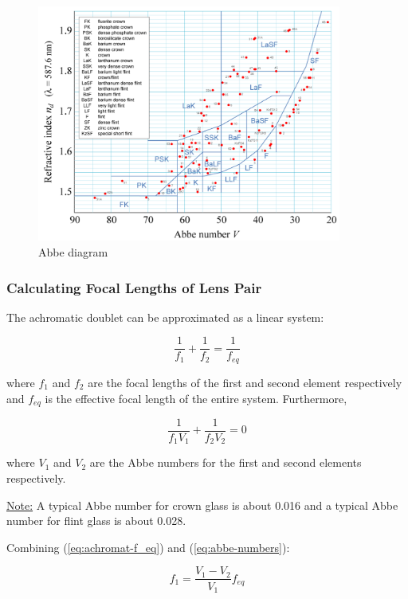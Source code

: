 \begin{figure}[H]
\centering
\includegraphics[width=10cm]{figures/abbe-diagram.png}
\caption{Abbe diagram \cite{Opticsforhire}}
\label{fig:abbe}
\end{figure}

\subsubsection{Calculating Focal Lengths of Lens Pair}

The achromatic doublet can be approximated as a linear system:

\begin{equation} \label{eq:achromat-f_eq}
    \frac{1}{f_1} + \frac{1}{f_2} = \frac{1}{f_{eq}}
\end{equation}

where $f_1$ and $f_2$ are the focal lengths of the first and second element respectively and $f_{eq}$ is the effective focal length of the entire system. Furthermore,

\begin{equation}
    \label{eq:abbe-numbers}
    \frac{1}{f_1 V_1} + \frac{1}{f_2 V_2} = 0
\end{equation}

where $V_1$ and $V_2$ are the Abbe numbers for the first and second elements respectively. 

\bigskip

\underline{Note:} A typical Abbe number for crown glass is about 0.016 and a typical Abbe number for flint glass is about 0.028.

\bigskip

Combining (\eqref{eq:achromat-f_eq}) and (\eqref{eq:abbe-numbers}):

\begin{equation}
    \label{eq:f_1}
    f_1 = \frac{V_1-V_2}{V_1}f_{eq}
\end{equation}


